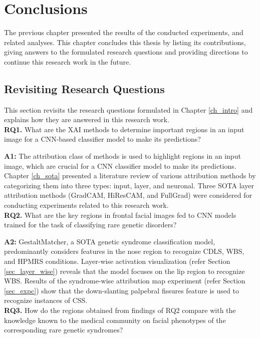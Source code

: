 \documentclass[../report.tex]{subfiles}
\begin{document}
    \chapter{Conclusions}
    \noindent
	The previous chapter presented the results of the conducted experiments, and related analyses. This chapter concludes this thesis by listing its contributions, giving answers to the formulated research questions and providing directions to continue this research work in the future.
	\section{Revisiting Research Questions}
	\noindent
	This section revisits the research questions formulated in Chapter \ref{ch_intro} and explains how they are answered in this research work.\\
	
	
	\textbf{RQ1.} What are the XAI methods to determine important regions in an input image for a CNN-based classifier model to make its predictions?
	
	\textbf{A1:} The attribution class of methods is used to highlight regions in an input image, which are crucial for a CNN classifier model to make its predictions. Chapter \ref{ch_sota} presented a literature review of various attribution methods by categorizing them into three types: input, layer, and neuronal. Three SOTA layer attribution methods (GradCAM, HiResCAM, and FullGrad) were considered for conducting experiments related to this research work.\\
	
	\textbf{RQ2.} What are the key regions in frontal facial images fed to CNN models trained for the task of classifying rare genetic disorders?
	
	\textbf{A2:} GestaltMatcher, a SOTA genetic syndrome classification model, predominantly considers features in the nose region to recognize CDLS, WBS, and HPMRS conditions. Layer-wise activation visualization (refer Section \ref{sec_layer_wise}) reveals that the model focuses on the lip region to recognize WBS. Results of the syndrome-wise attribution map experiment (refer Section \ref{sec_expc}) show that the down-slanting palpebral fissures feature is used to recognize instances of CSS. \\
	
	
	\textbf{RQ3.} How do the regions obtained from findings of RQ2 compare with the knowledge known to the medical community on facial phenotypes of the corresponding rare genetic syndromes?
\end{document}
